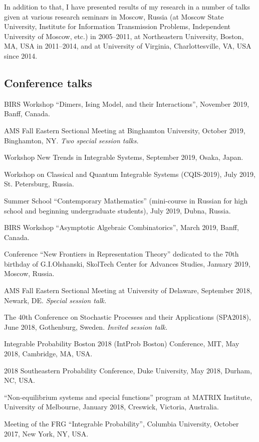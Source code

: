 \documentclass[letterpaper,11pt]{article}
\begin{document}
In addition to that, I have presented results of my research in a number of
talks given at various research seminars in Moscow, Russia (at Moscow State
University, Institute for Information Transmission Problems, Independent
University of Moscow, etc.) in 2005--2011, at Northeastern University, Boston,
MA, USA in 2011--2014, and at University of Virginia, Charlottesville, VA, USA
since 2014.

\subsection*{Conference talks}

\begin{etaremune}
	\item
		BIRS Workshop ``Dimers, Ising Model, and their Interactions'',
		November 2019, Banff, Canada.
	\item AMS Fall Eastern Sectional Meeting
	at 
	Binghamton University, 
	October 2019,
	Binghamton, NY.
	\emph{Two special session talks.}
	\item 
		Workshop New Trends in Integrable Systems, 
		September 2019, Osaka, Japan.
	\item 
		Workshop on Classical and Quantum Integrable
		Systems (CQIS-2019), July 2019, St. Petersburg, Russia.
	\item  
		Summer School ``Contemporary Mathematics'' (mini-course in Russian for 
		high school and beginning undergraduate students), 
		July 2019, Dubna, Russia.
	\item
		BIRS Workshop ``Asymptotic Algebraic Combinatorics'',
		March 2019, Banff, Canada.
	\item Conference ``New Frontiers in Representation Theory'' dedicated to the 70th birthday of G.I.Olshanski, SkolTech Center for Advances Studies, January 2019, Moscow, Russia.
\item AMS Fall Eastern Sectional Meeting
	at University of Delaware,
	September 2018, Newark, DE.
		\emph{Special session talk.}
	\item
    The 40th Conference on Stochastic Processes and their
    Applications (SPA2018), June 2018, 
		Gothenburg, Sweden.
		\emph{Invited session talk.}
	\item
		Integrable Probability Boston 2018 (IntProb Boston)
		Conference, 
		MIT,
		May 2018, 
		Cambridge, MA, USA.
	\item
		2018 Southeastern Probability Conference,
		Duke University, 
		May 2018,
		Durham, NC, USA.
	\item 
		``Non-equilibrium systems and special functions'' program at MATRIX Institute,
		University of Melbourne, 
		January 2018, 
		Creswick, Victoria, Australia.
	\item 
		Meeting of the 
		FRG ``Integrable Probability'', Columbia University,
		October 2017, New York, NY, USA.


\end{etaremune}
\end{document}
